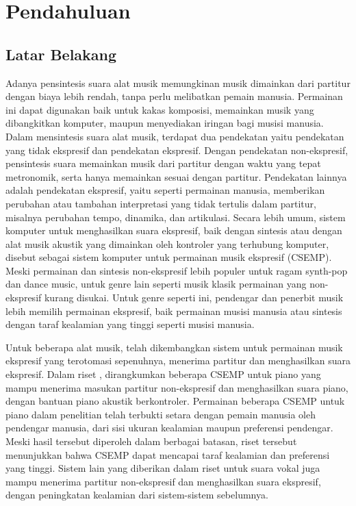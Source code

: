 \chapter{Pendahuluan}

\section{Latar Belakang}

Adanya pensintesis suara alat musik memungkinan musik dimainkan dari partitur dengan biaya lebih rendah, tanpa perlu melibatkan pemain manusia. Permainan ini dapat digunakan baik untuk kakas komposisi, memainkan musik yang dibangkitkan komputer, maupun menyediakan iringan bagi musisi manusia. Dalam mensintesis suara alat musik, terdapat dua pendekatan yaitu pendekatan yang tidak ekspresif dan pendekatan ekspresif. Dengan pendekatan non-ekspresif, pensintesis suara memainkan musik dari partitur dengan waktu yang tepat metronomik, serta hanya memainkan sesuai dengan partitur. Pendekatan lainnya adalah pendekatan ekspresif, yaitu seperti permainan manusia, memberikan perubahan atau tambahan interpretasi yang tidak tertulis dalam partitur, misalnya perubahan tempo, dinamika, dan artikulasi. Secara lebih umum, sistem komputer untuk menghasilkan suara ekspresif, baik dengan sintesis atau dengan alat musik akustik yang dimainkan oleh kontroler yang terhubung komputer, disebut sebagai sistem komputer untuk permainan musik ekspresif (CSEMP). Meski permainan dan sintesis non-ekspresif lebih populer untuk ragam synth-pop dan dance music, untuk genre lain seperti musik klasik permainan yang non-ekspresif kurang disukai. Untuk genre seperti ini, pendengar dan penerbit musik lebih memilih permainan ekspresif, baik permainan musisi manusia atau sintesis dengan taraf kealamian yang tinggi seperti musisi manusia.\parencite{Kirke:2009:SCS:1592451.1592454}

Untuk beberapa alat musik, telah dikembangkan sistem untuk permainan musik ekspresif yang terotomasi sepenuhnya, menerima partitur dan menghasilkan suara ekspresif. Dalam riset \citet{schubert2017test}, dirangkumkan beberapa CSEMP untuk piano yang mampu menerima masukan partitur non-ekspresif dan menghasilkan suara piano, dengan bantuan piano akustik berkontroler. Permainan beberapa CSEMP untuk piano dalam penelitian \citet{schubert2017test} telah terbukti setara dengan pemain manusia oleh pendengar manusia, dari sisi ukuran kealamian maupun preferensi pendengar. Meski hasil tersebut diperoleh dalam berbagai batasan, riset tersebut menunjukkan bahwa CSEMP dapat mencapai taraf kealamian dan preferensi yang tinggi. Sistem lain yang diberikan dalam riset \citet{bonada2017singing} untuk suara vokal juga mampu menerima partitur non-ekspresif dan menghasilkan suara ekspresif, dengan peningkatan kealamian dari sistem-sistem sebelumnya.

